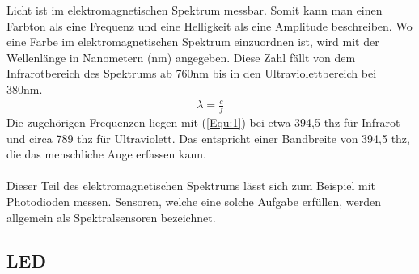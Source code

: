 \documentclass[11pt]{scrartcl}
\begin{document}
\noindent
Licht ist im elektromagnetischen Spektrum messbar. Somit kann man einen Farbton als eine Frequenz und eine Helligkeit als eine Amplitude beschreiben.
Wo eine Farbe im elektromagnetischen Spektrum einzuordnen ist, wird mit der Wellenlänge in Nanometern (nm) angegeben. Diese Zahl fällt von
dem Infrarotbereich des Spektrums ab 760nm bis in den Ultraviolettbereich bei 380nm.
\begin{align}\label{Equ:1}
    \lambda = \frac{c}{f}
\end{align}
Die zugehörigen Frequenzen liegen mit (\ref{Equ:1}) bei etwa 394,5 \ac{thz} für Infrarot und circa 789 \ac{thz} für Ultraviolett. Das
entspricht einer Bandbreite von 394,5 \ac{thz}, die das menschliche Auge erfassen kann.\\
\\
Dieser Teil des elektromagnetischen Spektrums lässt sich zum Beispiel mit Photodioden messen. Sensoren, welche eine solche Aufgabe erfüllen,
werden allgemein als Spektralsensoren bezeichnet.
\clearpage

\subsection{LED}
\end{document}
